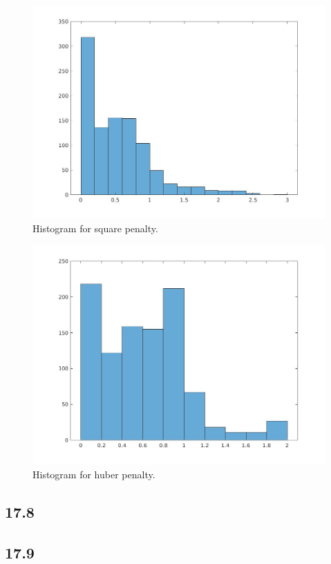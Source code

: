 \documentclass[12pt]{article}
\begin{document}
\begin{figure}[h]
\centering
\includegraphics[scale=.25]{histogram_square_penalty.jpg}
\caption{Histogram for square penalty.}
\end{figure}

\begin{figure}[h]
\centering
\includegraphics[scale=.25]{histogram_huber_penalty.jpg}
\caption{Histogram for huber penalty.}
\end{figure}

\subsection*{17.8}
\subsection*{17.9}
 
\end{document}
